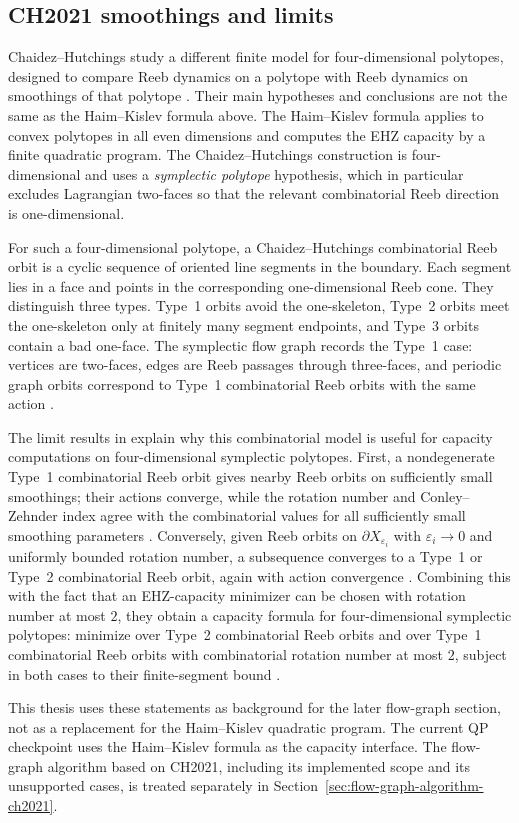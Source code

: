 \subsection{CH2021 smoothings and limits}
\label{subsec:generalized-reeb-orbits-polytopes-ch2021}

Chaidez--Hutchings study a different finite model for four-dimensional
polytopes, designed to compare Reeb dynamics on a polytope with Reeb dynamics
on smoothings of that polytope \cite{CH2021}. Their main hypotheses and
conclusions are not the same as the Haim--Kislev formula above. The
Haim--Kislev formula applies to convex polytopes in all even dimensions and
computes the EHZ capacity by a finite quadratic program. The
Chaidez--Hutchings construction is four-dimensional and uses a
\emph{symplectic polytope} hypothesis, which in particular excludes
Lagrangian two-faces so that the relevant combinatorial Reeb direction is
one-dimensional.

For such a four-dimensional polytope, a Chaidez--Hutchings combinatorial Reeb
orbit is a cyclic sequence of oriented line segments in the boundary. Each
segment lies in a face and points in the corresponding one-dimensional Reeb
cone. They distinguish three types. Type~1 orbits avoid the one-skeleton,
Type~2 orbits meet the one-skeleton only at finitely many segment endpoints,
and Type~3 orbits contain a bad one-face. The symplectic flow graph records
the Type~1 case: vertices are two-faces, edges are Reeb passages through
three-faces, and periodic graph orbits correspond to Type~1 combinatorial Reeb
orbits with the same action \cite[Proposition~2.2]{CH2021}.

The limit results in \cite{CH2021} explain why this combinatorial model is
useful for capacity computations on four-dimensional symplectic polytopes.
First, a nondegenerate Type~1 combinatorial Reeb orbit gives nearby Reeb orbits
on sufficiently small smoothings; their actions converge, while the rotation
number and Conley--Zehnder index agree with the combinatorial values for all
sufficiently small smoothing parameters \cite[Theorem~1.8]{CH2021}. Conversely,
given Reeb orbits on \(\partial X_{\varepsilon_i}\) with
\(\varepsilon_i\to0\) and uniformly bounded rotation number, a subsequence
converges to a Type~1 or Type~2 combinatorial Reeb orbit, again with action
convergence \cite[Theorem~1.9]{CH2021}. Combining this with the fact that an
EHZ-capacity minimizer can be chosen with rotation number at most \(2\), they
obtain a capacity formula for four-dimensional symplectic polytopes: minimize
over Type~2 combinatorial Reeb orbits and over Type~1 combinatorial Reeb orbits
with combinatorial rotation number at most \(2\), subject in both cases to
their finite-segment bound \cite[Corollary~1.13]{CH2021}.

This thesis uses these statements as background for the later flow-graph
section, not as a replacement for the Haim--Kislev quadratic program. The
current QP checkpoint uses the Haim--Kislev formula as the capacity interface.
The flow-graph algorithm based on CH2021, including its implemented scope and
its unsupported cases, is treated separately in
Section~\ref{sec:flow-graph-algorithm-ch2021}.
